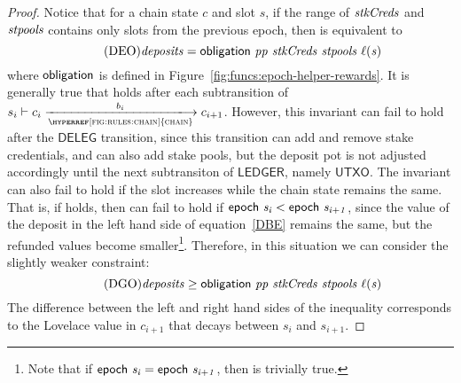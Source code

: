 \begin{proof}
  Notice that for a chain state $c$ and slot $s$, if the range of
  $\mathit{stkCreds}$ and $\mathit{stpools}$ contains only slots from the previous epoch,
  then  is equivalent to
  \begin{equation}\tag{DEO}\label{DEO}
    \mathit{deposits} = \mathsf{obligation}~ \mathit{pp}~ \mathit{stkCreds}~ \mathit{stpools}~ \mathit{\ell(s)}
  \end{equation}
  where $\mathsf{obligation}$ is defined in Figure~\ref{fig:funcs:epoch-helper-rewards}.
%
  It is generally true that  holds after each subtransition of
  $s_i\vdash c_i\trans{\hyperref[fig:rules:chain]{chain}}{b_i}c_{i+1}$.
  However, this invariant can fail to hold after the
  $\hyperref[fig:delegation-transitions]{\mathsf{DELEG}}$ transition,
  since this transition can add and remove stake credentials, and can also add stake pools,
  but the deposit pot is not adjusted accordingly
  until the next subtransiton of $\hyperref[fig:rules:ledger]{\mathsf{LEDGER}}$,
  namely $\hyperref[fig:rules:utxo-shelley]{\mathsf{UTXO}}$.
%
  The invariant can also fail to hold if the slot increases while the chain state remains the same.
  That is, if  holds, then  can fail to hold if
  $\mathsf{epoch}~ \mathit{s_i} < \mathsf{epoch}~ \mathit{s_{i+1}}$, since the value of the deposit
  in the left hand side of equation~\ref{DBE} remains the same, but the
  refunded values become smaller\footnote{Note that if $\mathsf{epoch}~ \mathit{s_i} = \mathsf{epoch}~ \mathit{s_{i+1}}$, then  is trivially true.}.
  Therefore, in this situation we can consider the slightly weaker constraint:
  \begin{equation}\tag{DGO}\label{DGTO}
    \mathit{deposits} \geq \mathsf{obligation}~ \mathit{pp}~ \mathit{stkCreds}~ \mathit{stpools}~ \mathit{\ell(s)}
  \end{equation}
  The difference between the left and right hand sides of the inequality
  corresponds to the Lovelace value in $c_{i+1}$ that decays between $s_i$ and $s_{i+1}$.


\end{proof}
